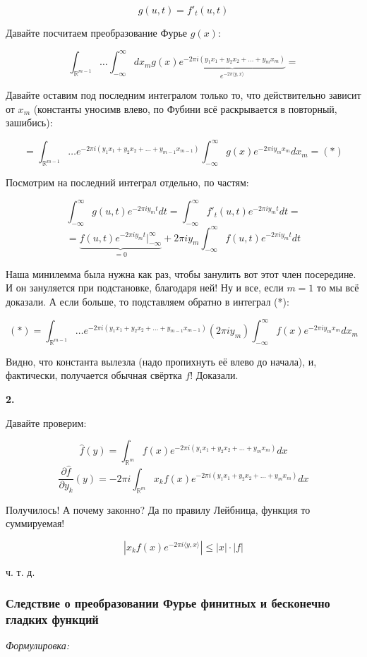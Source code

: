 \documentclass{article}
\def\sk#1#2{\langle #1, #2 \rangle}
\begin{document}
\[g(u, t) = f'_t(u, t)\]

Давайте посчитаем преобразование Фурье $g(x)$:

\[\int_{\mathbb{R}^{m-1}} \ldots \int_{-\infty}^{\infty} dx_m g(x) \underbrace{e^{- 2 \pi i (y_1 x_1 + y_2 x_2 + \ldots + y_m x_m)}}_{e^{- 2 \pi \sk{y}{x}}} = \]

Давайте оставим под последним интегралом только то, что действительно зависит от $x_m$ (константы уносимв влево, по Фубини всё раскрывается в повторный, зашибись):

\[ = \int_{\mathbb{R}^{m-1}} \ldots e^{- 2 \pi i (y_1 x_1 + y_2 x_2 + \ldots + y_{m - 1} x_{m - 1})}\int_{-\infty}^{\infty} g(x) e^{-2 \pi i y_m x_m} dx_m = (*)\]

Посмотрим на последний интеграл отдельно, по частям:

\[\int_{-\infty}^{\infty} g(u , t) e^{-2 \pi i y_m t} dt = \int_{-\infty}^{\infty} f'_t(u , t) e^{-2 \pi i y_m t} dt = \] 
\[ = \underbrace{f(u, t)e^{-2 \pi i y_m t}|_{-\infty}^{\infty}}_{=0} + 2 \pi i y_m\int_{-\infty}^{\infty}f(u, t)e^{-2 \pi i y_m t}dt\]

Наша минилемма была нужна как раз, чтобы занулить вот этот член посередине. И он зануляется при подстановке, благодаря ней! Ну и все, если $m = 1$ то мы всё доказали. А если больше, то подставляем обратно в интеграл (*):

\[(*) = \int_{\mathbb{R}^{m-1}} \ldots e^{- 2 \pi i (y_1 x_1 + y_2 x_2 + \ldots + y_{m - 1} x_{m - 1})} (2\pi i y_m)\int_{-\infty}^{\infty} f(x) e^{-2 \pi i y_m x_m} dx_m \]

Видно, что константа вылезла (надо пропихнуть её влево до начала), и, фактически, получается обычная свёртка $f$! Доказали.

\textbf{2.} 

Давайте проверим:

\[\hat{f}(y) = \int_{\mathbb{R}^m} f(x)e^{-2\pi i (y_1 x_1 + y_2 x_2 + \ldots + y_m x_m)} dx\]
\[\frac{\partial \hat{f}}{\partial y_k}(y) = -2\pi i\int_{\mathbb{R}^m} x_kf(x)e^{-2\pi i (y_1 x_1 + y_2 x_2 + \ldots + y_m x_m)} dx\]

Получилось! А почему законно? Да по правилу Лейбница, функция то суммируемая!

\[|x_kf(x)e^{-2\pi i \sk{y}{x}}| \le |x| \cdot |f|\]

ч. т. д. 

\subsubsection{Следствие о преобразовании Фурье финитных и бесконечно гладких функций}
\textit{Формулировка:}
\end{document}
